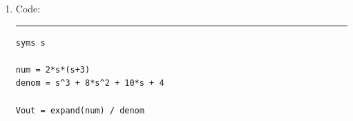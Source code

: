 \documentclass[11pt]{article}
\begin{document}
\begin{enumerate}[leftmargin=*,label=\textbf{\arabic*.}]
By the voltage divider,
\[V_\text{out}=I\cdot\frac{1\cdot0.5s}{1+0.5s}=\frac{2s(s+3)}{s^3+8s^2+10s+4}.\]

Find the roots of the expression in the denominator. Numerical approximation gives
\[s_1\approx-6.57,\quad s_2\approx-0.715+j0.313,\quad s_3\approx-0.715-j0.313=s_2^*.\]

Apply partial fraction decomposition.
\[\frac{2s(s+3)}{s^3+8s^2+10s+4}=\frac{A}{s+6.57}+\frac{B}{s+0.715+j0.313}+\frac{C}{s+0.715-j0.313}\]

Find the values $A, B$, and $C$.
\[A=\left.\frac{2s(s+3)}{(s+0.715+j0.313)(s+0.715-j0.313)}\right|_{s=-6.57}\approx1.364\]
\[B=\left.\frac{2s(s+3)}{(s+6.57)(s+0.715-j0.313)}\right|_{s=-0.715-j0.313}\approx0.318-j0.927\approx0.980\,\phase{-71.1^\circ}\]
\[C=\left.\frac{2s(s+3)}{(s+6.57)(s+0.715+j0.313)}\right|_{s=-0.715+j0.313}\approx0.318+j0.927\approx0.980\,\phase{71.1^\circ}\]

Using the inverse Laplace transform table, the solution is then
\[v_\text{out}(t)=\mathcal{L}^{-1}\left\{V_\text{out}(s)\right\}=\left[1.364e^{-6.57t}+1.96e^{-0.715t}\cos(0.313t+71.1^\circ)\right]\cdot u(t).\]





\newpage

\item Code:

\vspace{1em}

\hrule
\begin{verbatim}
syms s

num = 2*s*(s+3)
denom = s^3 + 8*s^2 + 10*s + 4

Vout = expand(num) / denom


\end{verbatim}
\end{enumerate}
\end{document}
